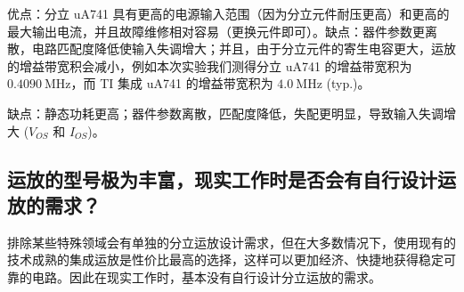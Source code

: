\documentclass[UTF8]{article}
\begin{document}
优点：分立 uA741 具有更高的电源输入范围（因为分立元件耐压更高）和更高的最大输出电流，并且故障维修相对容易（更换元件即可）。缺点：器件参数更离散，电路匹配度降低使输入失调增大；并且，由于分立元件的寄生电容更大，运放的增益带宽积会减小，例如本次实验我们测得分立 uA741 的增益带宽积为 $0.4090 \ \mathrm{MHz}$，而 TI 集成 uA741 的增益带宽积为 $4.0 \ \mathrm{MHz}$ (typ.)。

缺点：静态功耗更高；器件参数离散，匹配度降低，失配更明显，导致输入失调增大 ($V_{OS}$ 和 $I_{OS}$)。

\subsection{运放的型号极为丰富，现实工作时是否会有自行设计运放的需求？}

排除某些特殊领域会有单独的分立运放设计需求，但在大多数情况下，使用现有的技术成熟的集成运放是性价比最高的选择，这样可以更加经济、快捷地获得稳定可靠的电路。因此在现实工作时，基本没有自行设计分立运放的需求。





\end{document}
